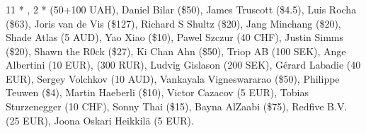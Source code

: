 \subsubsection*{}

11 * , 
2 *  (50+100 UAH), 
Daniel Bilar (\$50), 
James Truscott (\$4.5),
Luis Rocha (\$63), 
Joris van de Vis (\$127), 
Richard S Shultz (\$20), 
Jang Minchang (\$20), 
Shade Atlas (5 AUD), 
Yao Xiao (\$10),
Pawel Szczur (40 CHF), 
Justin Simms (\$20), 
Shawn the R0ck (\$27), 
Ki Chan Ahn (\$50), 
Triop AB (100 SEK), 
Ange Albertini (10 EUR),
 (300 RUR), 
Ludvig Gislason (200 SEK), 
Gérard Labadie (40 EUR), 
Sergey Volchkov (10 AUD),
Vankayala Vigneswararao (\$50),
Philippe Teuwen (\$4),
Martin Haeberli (\$10),
Victor Cazacov (5 EUR),
Tobias Sturzenegger (10 CHF),
Sonny Thai (\$15),
Bayna AlZaabi (\$75),
Redfive B.V. (25 EUR),
Joona Oskari Heikkilä (5 EUR).
